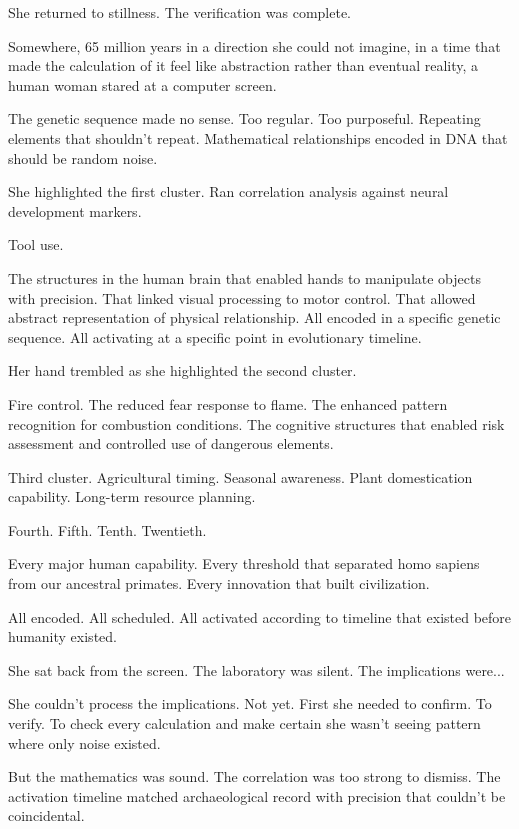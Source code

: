 She returned to stillness. The verification was complete.

\scenebreak

Somewhere, 65 million years in a direction she could not imagine, in a time that made the calculation of it feel like abstraction rather than eventual reality, a human woman stared at a computer screen.

The genetic sequence made no sense. Too regular. Too purposeful. Repeating elements that shouldn't repeat. Mathematical relationships encoded in DNA that should be random noise.

She highlighted the first cluster. Ran correlation analysis against neural development markers.

Tool use.

The structures in the human brain that enabled hands to manipulate objects with precision. That linked visual processing to motor control. That allowed abstract representation of physical relationship. All encoded in a specific genetic sequence. All activating at a specific point in evolutionary timeline.

Her hand trembled as she highlighted the second cluster.

Fire control. The reduced fear response to flame. The enhanced pattern recognition for combustion conditions. The cognitive structures that enabled risk assessment and controlled use of dangerous elements.

Third cluster. Agricultural timing. Seasonal awareness. Plant domestication capability. Long-term resource planning.

Fourth. Fifth. Tenth. Twentieth.

Every major human capability. Every threshold that separated homo sapiens from our ancestral primates. Every innovation that built civilization.

All encoded. All scheduled. All activated according to timeline that existed before humanity existed.

She sat back from the screen. The laboratory was silent. The implications were...

She couldn't process the implications. Not yet. First she needed to confirm. To verify. To check every calculation and make certain she wasn't seeing pattern where only noise existed.

But the mathematics was sound. The correlation was too strong to dismiss. The activation timeline matched archaeological record with precision that couldn't be coincidental.

